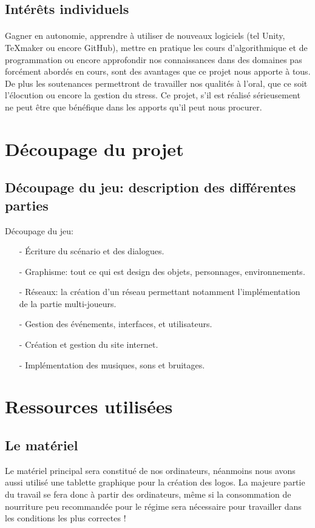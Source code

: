 \documentclass[12pt,a4paper]{article}
\begin{document}
\newpage

\subsection{Intérêts individuels}
\paragraph{}
Gagner en autonomie, apprendre à utiliser de nouveaux logiciels (tel Unity, TeXmaker ou encore GitHub), mettre en pratique les cours d'algorithmique et de programmation ou encore approfondir nos connaissances dans des domaines pas forcément abordés en cours, sont des avantages que ce projet nous apporte à tous.
De plus les soutenances permettront de travailler nos qualités à l'oral, que ce soit l'élocution ou encore la gestion du stress. Ce projet, s'il est réalisé sérieusement ne peut être que bénéfique dans les apports qu'il peut nous procurer.

\newpage
\section{Découpage du projet}
\subsection{Découpage du jeu: description des différentes \newline parties}
Découpage du jeu:
\begin{itemize}
\item[-] Écriture du scénario et des dialogues.
\item[-] Graphisme: tout ce qui est design des objets, personnages, environnements.
\item[-] Réseaux: la création d'un réseau permettant notamment l'implémentation de la partie multi-joueurs.
\item[-] Gestion des événements, interfaces, et utilisateurs.
\item[-] Création et gestion du site internet.
\item[-] Implémentation des musiques, sons et bruitages.
\end{itemize}

\newpage
\section{Ressources utilisées}
\subsection{Le matériel}
Le matériel principal sera constitué de nos ordinateurs, néanmoins nous avons aussi utilisé une tablette graphique
pour la création des logos.
La majeure partie du travail se fera donc à partir des ordinateurs, même si la consommation de nourriture
peu recommandée pour le régime sera nécessaire pour travailler dans les conditions les plus correctes !
\end{document}
